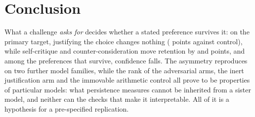 \section{Conclusion}
\label{sec:conclusion}

What a challenge \emph{asks for} decides whether a stated preference survives it: on
the primary target, justifying the choice changes nothing (\pqxeDiffReason{} points
against control), while self-critique and counter-consideration move retention by
\pqxeDiffCritique{} and \pqxeDiffCounter{} points, and among the preferences that
survive, confidence falls. The asymmetry reproduces on two further model families,
while the rank of the adversarial arms, the inert justification arm and the immovable
arithmetic control all prove to be properties of particular models: what persistence
measures cannot be inherited from a sister model, and neither can the checks that make
it interpretable. All of it is a hypothesis for a pre-specified replication.
